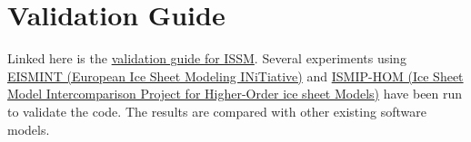 
\section{Validation Guide} \label{sec:supplements-validation}
Linked here is the \href{https://issm.jpl.nasa.gov/validation/validation.pdf}{validation guide for ISSM}. Several experiments using \href{https://uia.org/s/or/en/1100064309}{EISMINT (European Ice Sheet Modeling INiTiative)} and \href{https://frank.pattyn.web.ulb.be/ismip/welcome.html}{ISMIP-HOM (Ice Sheet Model Intercomparison Project for Higher-Order ice sheet Models)} have been run to validate the code. The results are compared with other existing software models.

\clearpage %
